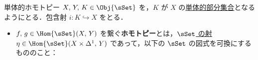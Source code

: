 \documentclass[TQFT_main]{subfiles}
\begin{document}
\begin{mydef}[label=def:SimpSet-homotopic,breakable]{単体的ホモトピー}
    $X,\, Y,\, K\in \Obj{\sSet}$ を，$K$ が $X$ の\hyperref[def:SimpSet]{単体的部分集合}となるようにとる．包含射 $i \colon K \hookrightarrow X$ をとる．
    \begin{itemize}
        \item 
        $f,\, g \in \Hom{\sSet} (X,\, Y)$ を繋ぐ\textbf{ホモトピー}とは，\hyperref[def:SimpSet]{$\sSet$ の射} $\eta \in \Hom{\sSet}(X \times \Delta^1,\, Y)$ であって，以下の $\sSet$ の図式を可換にするもののこと：
        \begin{center}
        \end{center}

\end{itemize}
\end{mydef}
\end{document}

